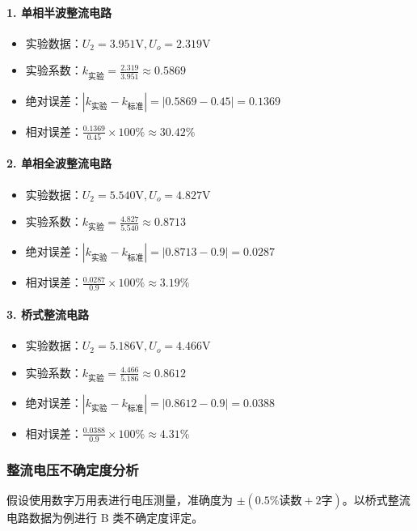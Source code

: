 \documentclass[]{../template/Report}%
\begin{document}
\begin{fullreportonly}
\paragraph{1. 单相半波整流电路}
\begin{itemize}
    \item 实验数据：$U_2 = 3.951\text{V}, U_o = 2.319\text{V}$
    \item 实验系数：$k_{\text{实验}} = \frac{2.319}{3.951} \approx 0.5869$
    \item 绝对误差：$|k_{\text{实验}} - k_{\text{标准}}| = |0.5869 - 0.45| = 0.1369$
    \item 相对误差：$\frac{0.1369}{0.45} \times 100\% \approx 30.42\%$
\end{itemize}

\paragraph{2. 单相全波整流电路}
\begin{itemize}
    \item 实验数据：$U_2 = 5.540\text{V}, U_o = 4.827\text{V}$
    \item 实验系数：$k_{\text{实验}} = \frac{4.827}{5.540} \approx 0.8713$
    \item 绝对误差：$|k_{\text{实验}} - k_{\text{标准}}| = |0.8713 - 0.9| = 0.0287$
    \item 相对误差：$\frac{0.0287}{0.9} \times 100\% \approx 3.19\%$
\end{itemize}

\paragraph{3. 桥式整流电路}
\begin{itemize}
    \item 实验数据：$U_2 = 5.186\text{V}, U_o = 4.466\text{V}$
    \item 实验系数：$k_{\text{实验}} = \frac{4.466}{5.186} \approx 0.8612$
    \item 绝对误差：$|k_{\text{实验}} - k_{\text{标准}}| = |0.8612 - 0.9| = 0.0388$
    \item 相对误差：$\frac{0.0388}{0.9} \times 100\% \approx 4.31\%$
\end{itemize}

\subsubsection{整流电压不确定度分析}
假设使用数字万用表进行电压测量，准确度为 $\pm(0.5\% \text{读数} + 2\text{字})$。以桥式整流电路数据为例进行 B 类不确定度评定。


\end{fullreportonly}
\end{document}
